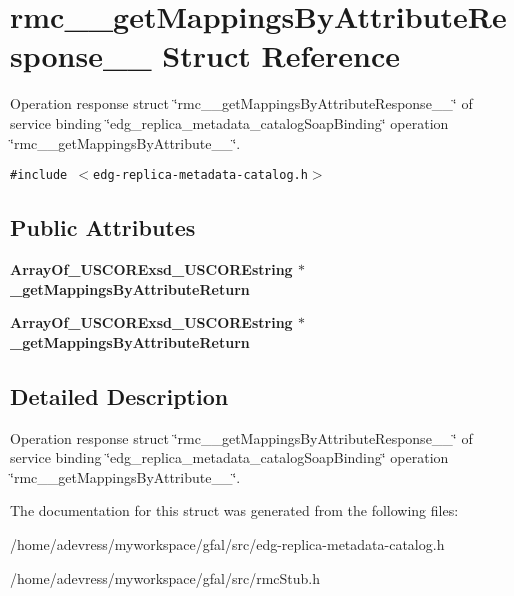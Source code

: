 \section{rmc\_\-\_\-get\-Mappings\-By\-Attribute\-Response\_\-\_\- Struct Reference}
\label{structrmc____getMappingsByAttributeResponse____}
Operation response struct \char`\"{}rmc\_\-\_\-get\-Mappings\-By\-Attribute\-Response\_\-\_\-\char`\"{} of service binding \char`\"{}edg\_\-replica\_\-metadata\_\-catalog\-Soap\-Binding\char`\"{} operation \char`\"{}rmc\_\-\_\-get\-Mappings\-By\-Attribute\_\-\_\-\char`\"{}.  


{\tt \#include $<$edg-replica-metadata-catalog.h$>$}

\subsection*{Public Attributes}
\begin{CompactItemize}
\item 
\bf{Array\-Of\_\-USCORExsd\_\-USCOREstring} $\ast$ \textbf{\_\-get\-Mappings\-By\-Attribute\-Return}\label{structrmc____getMappingsByAttributeResponse_____706e2f98a4964df5b01d3d746c224abb}

\item 
\bf{Array\-Of\_\-USCORExsd\_\-USCOREstring} $\ast$ \textbf{\_\-get\-Mappings\-By\-Attribute\-Return}\label{structrmc____getMappingsByAttributeResponse_____706e2f98a4964df5b01d3d746c224abb}

\end{CompactItemize}


\subsection{Detailed Description}
Operation response struct \char`\"{}rmc\_\-\_\-get\-Mappings\-By\-Attribute\-Response\_\-\_\-\char`\"{} of service binding \char`\"{}edg\_\-replica\_\-metadata\_\-catalog\-Soap\-Binding\char`\"{} operation \char`\"{}rmc\_\-\_\-get\-Mappings\-By\-Attribute\_\-\_\-\char`\"{}. 



The documentation for this struct was generated from the following files:\begin{CompactItemize}
\item 
/home/adevress/myworkspace/gfal/src/edg-replica-metadata-catalog.h\item 
/home/adevress/myworkspace/gfal/src/rmc\-Stub.h\end{CompactItemize}

